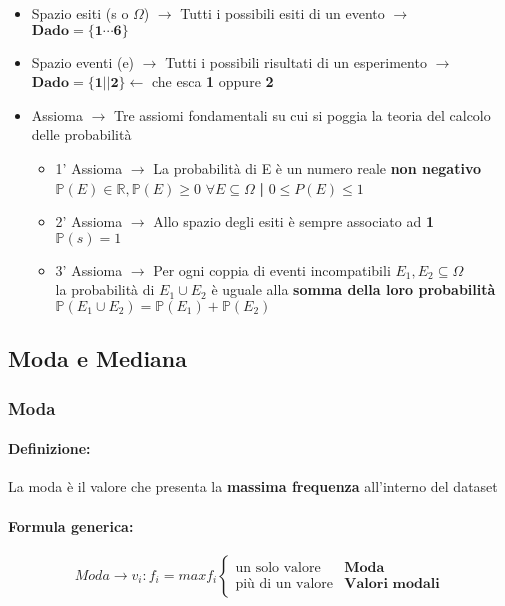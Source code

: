 \documentclass[]{article}
\newcommand{\definizione}{\paragraph{Definizione:}}
\newcommand{\formula}{\paragraph{Formula generica:}}
\begin{document}
\begin{itemize}
        \item Spazio esiti (s o $\Omega$) $\rightarrow$ Tutti i possibili esiti di un evento $\rightarrow$ $\boldsymbol{Dado=\{1 \cdots 6\}}$
        \item Spazio eventi (e) $\rightarrow$ Tutti i possibili risultati di un esperimento $\rightarrow$ $\boldsymbol{Dado=\{1||2\}} \leftarrow$ che esca \textbf{1} oppure \textbf{2}
        \item Assioma $\rightarrow$ Tre assiomi fondamentali su cui si poggia la teoria del calcolo delle probabilità
        \begin{itemize}
            \item 1' Assioma $\rightarrow$ La probabilità di E è un numero reale \textbf{non negativo} $\mathbb{P}(E) \in \mathbb{R}, \mathbb{P}(E) \geq 0$ $ \forall E \subseteq \Omega $ \space \textbf{|} \space $0 \leq P(E) \leq 1$
            \item 2' Assioma $\rightarrow$ Allo spazio degli esiti è sempre associato ad \textbf{1} \\ $\mathbb{P}(s) = 1$
            \item 3' Assioma $\rightarrow$ Per ogni coppia di eventi incompatibili $E_1, E_2 \subseteq \Omega$ \\ la probabilità di $E_1 \cup E_2$ è uguale alla \textbf{somma della loro probabilità} \\ $\mathbb{P}(E_1 \cup E_2) = \mathbb{P}(E_1) + \mathbb{P}(E_2)$
        \end{itemize} 
    \end{itemize}
    \newpage 

    \subsection{Moda e Mediana}
    \subsubsection{Moda}
    \definizione La moda è il valore che presenta la \textbf{massima frequenza} all'interno del dataset
    \formula
    \begin{equation*}
        Moda \rightarrow v_i : f_i = max f_i
        \begin{cases}
            \text{un solo valore} & \textbf{Moda} \\
            \text{più di un valore} & \textbf{Valori modali}
        \end{cases}
    \end{equation*}
\end{document}
